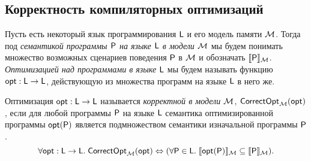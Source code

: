 \subsection{Корректность компиляторных оптимизаций}
Пусть есть некоторый язык программирования $\mathsf{L}$ и его модель памяти $\mathcal{M}$.
Тогда под \emph{семантикой программы $\mathsf{P}$ на языке $\mathsf{L}$ в модели $\mathcal{M}$}
мы будем понимать множество возможных сценариев поведения $\mathsf{P}$ в $\mathcal{M}$ и обозначать $\llbracket \mathsf{P} \rrbracket_{\mathcal{M}}$.
\emph{Оптимизацией над программами в языке $\mathsf{L}$} мы будем называть функцию $\mathsf{opt} : \mathsf{L} \rightarrow \mathsf{L}$, действующую из
множества программ на языке $\mathsf{L}$ в него же.
\begin{definition}
  Оптимизация $\mathsf{opt} : \mathsf{L} \rightarrow \mathsf{L}$ называется \emph{корректной в модели $\mathcal{M}$},
  $\mathsf{CorrectOpt}_{\mathcal{M}}(\mathsf{opt})$, если для любой программы $\mathsf{P}$ на языке $\mathsf{L}$
  семантика оптимизированной программы $\mathsf{opt}(\mathsf{P})$ является подмножеством семантики изначальной программы $\mathsf{P}$.
  \[\forall \mathsf{opt} : \mathsf{L} \rightarrow \mathsf{L}. \; \mathsf{CorrectOpt}_{\mathcal{M}}(\mathsf{opt}) \Leftrightarrow (\forall \mathsf{P} \in \mathsf{L}. \; \llbracket \mathsf{opt}(\mathsf{P}) \rrbracket_{\mathcal{M}} \subseteq \llbracket \mathsf{P} \rrbracket_{\mathcal{M}}). \]
\end{definition}

